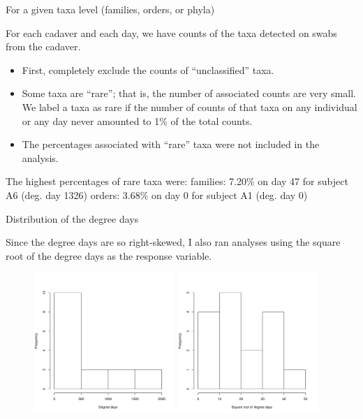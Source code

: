 \documentclass{beamer}
\begin{document}
\begin{frame}{For a given taxa level (families, orders, or phyla)}

  \noindent For each cadaver and each day, we have counts of the taxa
  detected on swabs from the cadaver.

  \begin{itemize}
    \item First, completely exclude the counts of ``unclassified''
      taxa.
    \item Some taxa are ``rare''; that is, the number of associated
      counts are very small.  We label a taxa as rare if the number of
      counts of that taxa on any individual or any day never amounted
      to 1\% of the total counts.
      \item The percentages associated with ``rare'' taxa were not
        included in the analysis.
    \end{itemize}

  \noindent The highest percentages of rare taxa were:
  families: 7.20\% on day 47 for subject A6 (deg. day 1326)
  orders: 3.68\% on day 0 for subject A1 (deg. day 0)
  



\end{frame}



\begin{frame}{Distribution of the degree days}

  {\scriptsize
  
    \noindent Since the degree days are so right-skewed, I also ran
    analyses using the square root of the degree days as the response
    variable.

    
\begin{figure}
  \includegraphics[width=2.1in]{degdays_all_time_steps_hist}
  \includegraphics[width=2.1in]{sqrt_degdays_all_time_steps_hist}
\end{figure}
  }
  
\end{frame}
\end{document}
